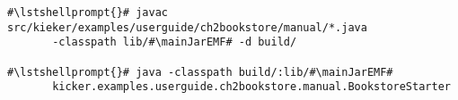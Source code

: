 \begin{lstlisting}[caption=Commands to compile and run the instrumented Bookstore under \UnixLikeSystems{},label=lst:bookstoreStarterLinux]
#\lstshellprompt{}# javac src/kieker/examples/userguide/ch2bookstore/manual/*.java 
       -classpath lib/#\mainJarEMF# -d build/

#\lstshellprompt{}# java -classpath build/:lib/#\mainJarEMF#
       kicker.examples.userguide.ch2bookstore.manual.BookstoreStarter
\end{lstlisting} 